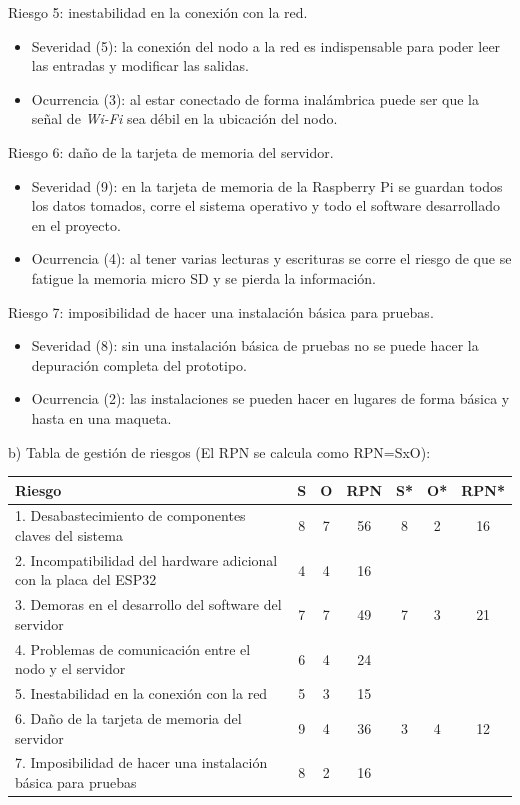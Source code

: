 \documentclass[
11pt, %
]{charter}
\begin{document}
Riesgo 5: inestabilidad en la conexión con la red.
\begin{itemize}
	\item Severidad (5): la conexión del nodo a la red es indispensable para poder leer las entradas y modificar las salidas.
	\item Ocurrencia (3): al estar conectado de forma inalámbrica puede ser que la señal de \textit{Wi-Fi} sea débil en la ubicación del nodo.
\end{itemize}

Riesgo 6: daño de la tarjeta de memoria del servidor.
\begin{itemize}
	\item Severidad (9): en la tarjeta de memoria de la Raspberry Pi se guardan todos los datos tomados, corre el sistema operativo y todo el software desarrollado en el proyecto.
	\item Ocurrencia (4): al tener varias lecturas y escrituras se corre el riesgo de que se fatigue la memoria micro SD y se pierda la información.
\end{itemize}

Riesgo 7: imposibilidad de hacer una instalación básica para pruebas.
\begin{itemize}
	\item Severidad (8): sin una instalación básica de pruebas no se puede hacer la depuración completa del prototipo.
	\item Ocurrencia (2): las instalaciones se pueden hacer en lugares de forma básica y hasta en una maqueta.
\end{itemize}

b) Tabla de gestión de riesgos (El RPN se calcula como RPN=SxO):

\begin{table}[htpb]
\centering
\begin{tabularx}{\linewidth}{@{}|X|c|c|c|c|c|c|@{}}
\hline
\rowcolor[HTML]{C0C0C0} 
Riesgo & S & O & RPN & S* & O* & RPN* \\ \hline
1. Desabastecimiento de componentes claves del sistema				&8	&7	&56\cellcolor{red}	&8	&2	&16\cellcolor{green}	\\ \hline
2. Incompatibilidad del hardware adicional con la placa del ESP32	&4	&4	&16\cellcolor{green}	&	&	&	\\ \hline
3. Demoras en el desarrollo del software del servidor				&7	&7	&49\cellcolor{red}	&7	&3	&21\cellcolor{green} 	\\ \hline
4. Problemas de comunicación entre el nodo y el servidor				&6	&4	&24\cellcolor{green}	&	&	& 	\\ \hline
5. Inestabilidad en la conexión con la red							&5	&3	&15\cellcolor{green}	&	&	&	\\ \hline
6. Daño de la tarjeta de memoria del servidor						&9	&4	&36\cellcolor{red}	&3	&4	&12\cellcolor{green}	\\ \hline
7. Imposibilidad de hacer una instalación básica para pruebas		&8	&2	&16\cellcolor{green}	&	&	&	\\ \hline
\end{tabularx}%
\end{table}
\end{document}
